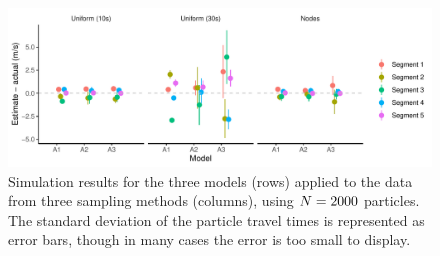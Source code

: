 \begin{knitrout}\small
{}\color{fgcolor}\begin{figure}
\includegraphics[width=\linewidth]{figure/sim1_pf-1} \caption[Simulation results for the three models (rows) applied to the data from three sampling methods (columns), using $\Np=2000$ particles]{Simulation results for the three models (rows) applied to the data from three sampling methods (columns), using $\Np=2000$ particles. The standard deviation of the particle travel times is represented as error bars, though in many cases the error is too small to display.}\label{fig:sim1_pf}
\end{figure}


\end{knitrout}

